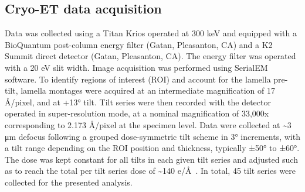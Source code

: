 \subsection{Cryo-ET data acquisition}\label{drad_tomo_method}
Data was collected using a Titan Krios operated at 300 keV and equipped with a BioQuantum post-column energy filter (Gatan, Pleasanton, CA) and a K2 Summit direct detector (Gatan, Pleasanton, CA).
The energy filter was operated with a 20 eV slit width.
Image acquisition was performed using SerialEM software.
To identify regions of interest (ROI) and account for the lamella pre-tilt, lamella montages were acquired at an intermediate magnification of 17 Å/pixel, and at +13° tilt.
Tilt series were then recorded with the detector operated in super-resolution mode, at a nominal magnification of 33,000x corresponding to 2.173 Å/pixel at the specimen level.
Data were collected at \sim3 μm defocus following a grouped dose-symmetric tilt scheme in 3° increments, with a tilt range depending on the ROI position and thickness, typically ±50° to ±60°.
The dose was kept constant for all tilts in each given tilt series and adjusted such as to reach the total per tilt series dose of \sim140 e/Å~\cite{ericksonHowBacterialCell2017}.
In total, 45 tilt series were collected for the presented analysis.

